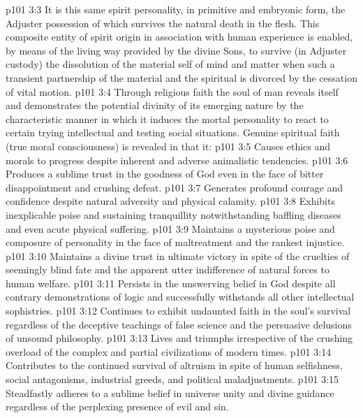 \vs p101 3:3 It is this same spirit personality, in primitive and embryonic form, the Adjuster possession of which survives the natural death in the flesh. This composite entity of spirit origin in association with human experience is enabled, by means of the living way provided by the divine Sons, to survive (in Adjuster custody) the dissolution of the material self of mind and matter when such a transient partnership of the material and the spiritual is divorced by the cessation of vital motion.
\vs p101 3:4 Through religious faith the soul of man reveals itself and demonstrates the potential divinity of its emerging nature by the characteristic manner in which it induces the mortal personality to react to certain trying intellectual and testing social situations. Genuine spiritual faith (true moral consciousness) is revealed in that it:
\vs p101 3:5 \bibnobreakspace Causes ethics and morals to progress despite inherent and adverse animalistic tendencies.
\vs p101 3:6 \bibnobreakspace Produces a sublime trust in the goodness of God even in the face of bitter disappointment and crushing defeat.
\vs p101 3:7 \bibnobreakspace Generates profound courage and confidence despite natural adversity and physical calamity.
\vs p101 3:8 \bibnobreakspace Exhibits inexplicable poise and sustaining tranquillity notwithstanding baffling diseases and even acute physical suffering.
\vs p101 3:9 \bibnobreakspace Maintains a mysterious poise and composure of personality in the face of maltreatment and the rankest injustice.
\vs p101 3:10 \bibnobreakspace Maintains a divine trust in ultimate victory in spite of the cruelties of seemingly blind fate and the apparent utter indifference of natural forces to human welfare.
\vs p101 3:11 \bibnobreakspace Persists in the unswerving belief in God despite all contrary demonstrations of logic and successfully withstands all other intellectual sophistries.
\vs p101 3:12 \bibnobreakspace Continues to exhibit undaunted faith in the soul’s survival regardless of the deceptive teachings of false science and the persuasive delusions of unsound philosophy.
\vs p101 3:13 \bibnobreakspace Lives and triumphs irrespective of the crushing overload of the complex and partial civilizations of modern times.
\vs p101 3:14 \bibnobreakspace Contributes to the continued survival of altruism in spite of human selfishness, social antagonisms, industrial greeds, and political maladjustments.
\vs p101 3:15 \bibnobreakspace Steadfastly adheres to a sublime belief in universe unity and divine guidance regardless of the perplexing presence of evil and sin.
